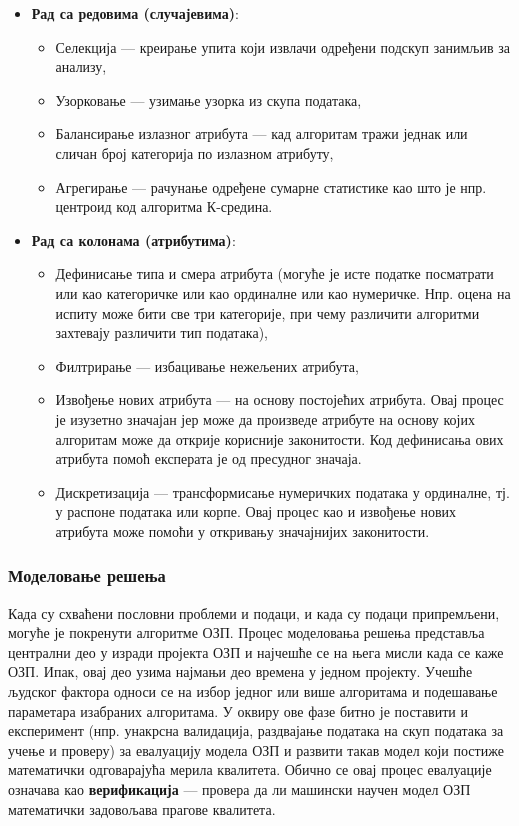 \begin{itemize}
  \item \textbf{Рад са редовима (случајевима)}:
  \begin{itemize}
    \item Селекција — креирање упита који извлачи одређени подскуп занимљив за анализу,
    \item Узорковање — узимање узорка из скупа података,
    \item Балансирање излазног атрибута — кад алгоритам тражи једнак или сличан број категорија по излазном атрибуту,
    \item Агрегирање — рачунање одређене сумарне статистике као што је нпр. центроид код алгоритма К-средина.
  \end{itemize}
  \item \textbf{Рад са колонама (атрибутима)}:
  \begin{itemize}
    \item Дефинисање типа и смера атрибута (могуће је исте податке посматрати или као категоричке или као ординалне или као нумеричке. Нпр. оцена на испиту може бити све три категорије, при чему различити алгоритми захтевају различити тип података),
    \item Филтрирање — избацивање нежељених атрибута,
    \item Извођење нових атрибута — на основу постојећих атрибута. Овај процес је изузетно значајан јер може да произведе атрибуте на основу којих алгоритам може да открије корисније законитости. Код дефинисања ових атрибута помоћ експерата је од пресудног значаја.
    \item Дискретизација — трансформисање нумеричких података у ординалне, тј. у распоне података или корпе. Овај процес као и извођење нових атрибута може помоћи у откривању значајнијих законитости.
  \end{itemize}
\end{itemize}

\subsubsection{Моделовање решења}
Када су схваћени пословни проблеми и подаци, и када су подаци припремљени, могуће је покренути алгоритме ОЗП. Процес моделовања решења представља централни део у изради пројекта ОЗП и најчешће се на њега мисли када се каже ОЗП. Ипак, овај део узима најмањи део времена у једном пројекту. Учешће људског фактора односи се на избор једног или више алгоритама и подешавање параметара изабраних алгоритама. У оквиру ове фазе битно је поставити и експеримент (нпр. унакрсна валидација, раздвајање података на скуп података за учење и проверу) за евалуацију модела ОЗП и развити такав модел који постиже математички одговарајућа мерила квалитета. Обично се овај процес евалуације означава као \textbf{верификација} — провера да ли машински научен модел ОЗП математички задовољава прагове квалитета.

